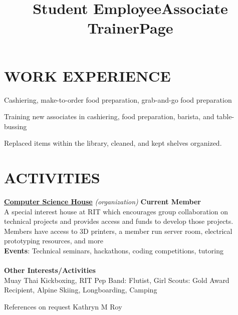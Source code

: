 \documentclass[line,margin]{res}
\begin{document}
\begin{resume}
\section{WORK EXPERIENCE}
\title{\textbf{Student Employee}}
\begin{position}
    Cashiering, make-to-order food preparation, grab-and-go food preparation
\end{position}
\title{\textbf{Associate Trainer}}
\begin{position}
    Training new associates in cashiering, food preparation, barista, and table-bussing
\end{position}
\title{\textbf{Page}}
\begin{position}
    Replaced items within the library, cleaned, and kept shelves organized.
\end{position}

\section{ACTIVITIES}
\href{https://csh.rit.edu}{\textbf{Computer Science House}}
{\sl (organization)}\hfill
\textbf{Current Member}\\
A special interest house at RIT which encourages group collaboration on technical 
projects and provides access and funds to develop those projects. Members have 
access to 3D printers, a member run server room, electrical prototyping 
resources, and more\\
\textbf{Events}: 
Technical seminars, hackathons, coding competitions, tutoring\\\\
\textbf{Other Interests/Activities}\\
Muay Thai Kickboxing, RIT Pep Band: Flutist, Girl Scouts: Gold Award Recipient, Alpine Skiing, Longboarding, Camping

\end{resume}

\scriptsize{References on request} \hfill 
\scriptsize{Kathryn M Roy} \hfill 
\end{document}
